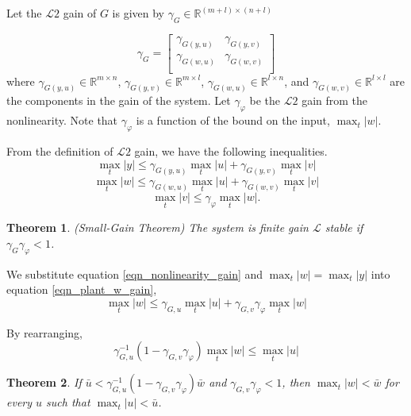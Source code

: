 \documentclass[journal]{IEEEtran}
\newtheorem{theorem}{Theorem}[section]
\begin{document}
Let the $\mathcal{L}2$ gain of $G$ is given by $\gamma_G\in\mathbb{R}^{(m+l)\times(n+l)}$

\begin{equation}
\gamma_G=\begin{bmatrix}
        \gamma_{G(y,u)} & \gamma_{G(y,v)} \\
        \gamma_{G(w,u)} & \gamma_{G(w,v)} \\
     \end{bmatrix}
\end{equation}
where $\gamma_{G(y,u)}\in\mathbb{R}^{m\times n}$,  $\gamma_{G(y,v)}\in\mathbb{R}^{m\times l}$,  $\gamma_{G(w,u)}\in\mathbb{R}^{l\times n}$, and  $\gamma_{G(w,v)}\in\mathbb{R}^{l\times l}$ are the components in the gain of the system. Let $\gamma_\varphi$ be the $\mathcal{L}2$ gain from the nonlinearity. Note that $\gamma_\varphi$ is a function of the bound on the input, $\max_t|w|$.

From the definition of $\mathcal{L}2$ gain, we have the following inequalities.
\begin{equation}
\max_t|y|\leq\gamma_{G(y,u)} \max_t|u|+\gamma_{G(y,v)}\max_t|v|
\label{eqn_plant_y_gain}
\end{equation}
\begin{equation}
\max_t|w|\leq\gamma_{G(w,u)} \max_t|u|+\gamma_{G(w,v)}\max_t|v|
\label{eqn_plant_w_gain}
\end{equation}
\begin{equation}
\max_t|v|\leq\gamma_\varphi \max_t|w|.
\label{eqn_nonlinearity_gain}
\end{equation}

\begin{theorem}
\textit{(Small-Gain Theorem)} The system is finite gain $\mathcal{L}$ stable if  $\gamma_G\gamma_\varphi<1$.
\end{theorem}

We substitute equation \ref{eqn_nonlinearity_gain} and $\max_t|w|=\max_t|y|$ into equation \ref{eqn_plant_w_gain},
\begin{equation}
\max_t|w|\leq\gamma_{G,u} \max_t|u|+\gamma_{G,v}\gamma_\varphi \max_t|w|
\label{eqn_w_leq_G}
\end{equation}

By rearranging,
\begin{equation}
\gamma_{G,u}^{-1}(1-\gamma_{G,v}\gamma_\varphi)\max_t|w|\leq\max_t|u|
\end{equation}

\begin{theorem}
If $\bar{u}<\gamma_{G,u}^{-1}(1-\gamma_{G,v}\gamma_\varphi)\bar{w}$ and $\gamma_{G,v}\gamma_\varphi<1$, then $\max_t|w|<\bar{w}$ for every $u$ such that $\max_t|u|<\bar{u}$.
\end{theorem}
\end{document}

